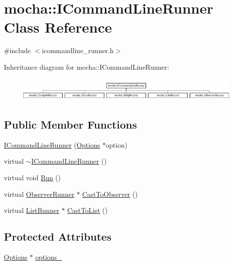 \hypertarget{classmocha_1_1_i_command_line_runner}{
\section{mocha::ICommandLineRunner Class Reference}
\label{classmocha_1_1_i_command_line_runner}
}


{\ttfamily \#include $<$icommandline\_\-runner.h$>$}

Inheritance diagram for mocha::ICommandLineRunner:\begin{figure}[H]
\begin{center}
\leavevmode
\includegraphics[height=1.204301cm]{classmocha_1_1_i_command_line_runner}
\end{center}
\end{figure}
\subsection*{Public Member Functions}
\begin{DoxyCompactItemize}
\item 
\hyperlink{classmocha_1_1_i_command_line_runner_a6e30b2d2403a5069897556548646f132}{ICommandLineRunner} (\hyperlink{classmocha_1_1_options}{Options} $\ast$option)
\item 
virtual \hyperlink{classmocha_1_1_i_command_line_runner_a0ee9de65d8b39cb10a4b44b33f69621f}{$\sim$ICommandLineRunner} ()
\item 
virtual void \hyperlink{classmocha_1_1_i_command_line_runner_a916078af76dc405721dfd512d68a123a}{Run} ()
\item 
virtual \hyperlink{classmocha_1_1_observer_runner}{ObserverRunner} $\ast$ \hyperlink{classmocha_1_1_i_command_line_runner_ac18a6dada2026d7c73c94f0549ec81d7}{CastToObserver} ()
\item 
virtual \hyperlink{classmocha_1_1_list_runner}{ListRunner} $\ast$ \hyperlink{classmocha_1_1_i_command_line_runner_a02fccc4dfd3eb365bfc137bcfa01036f}{CastToList} ()
\end{DoxyCompactItemize}
\subsection*{Protected Attributes}
\begin{DoxyCompactItemize}
\item 
\hyperlink{classmocha_1_1_options}{Options} $\ast$ \hyperlink{classmocha_1_1_i_command_line_runner_a8c0c8138647d2d144bf1c1b10cf6a27c}{options\_\-}
\end{DoxyCompactItemize}


